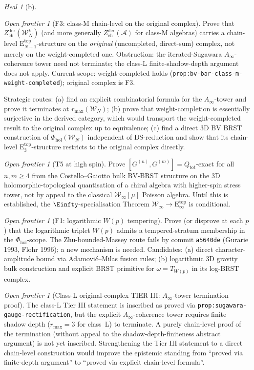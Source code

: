 \documentclass{article}
\theoremstyle{definition}
\theoremstyle{remark}
\newtheorem{heal}[theorem]{Heal}
\newtheorem{openfrontier}[theorem]{Open frontier}
\newcommand{\Phihol}{\Phi_{\mathrm{hol}}}
\newcommand{\Zder}{Z^{\mathrm{der}}_{\mathrm{ch}}}
\newcommand{\Etop}[1]{\mathrm{E}_{#1}^{\mathrm{top}}}
\newcommand{\cW}{\mathcal{W}}
\newcommand{\cA}{\mathcal{A}}
\begin{document}
\begin{heal}[b]
\begin{openfrontier}[F3: class-M chain-level on the original
complex]
\label{open:F3}
Prove that $\Zder(\cW_N^k)$ (and more generally
$\Zder(\cA)$ for class-M algebras) carries a chain-level
$\Etop{N+1}$-structure on the \emph{original} (uncompleted,
direct-sum) complex, not merely on the weight-completed
one. Obstruction: the iterated-Sugawara
$A_\infty$-coherence tower need not terminate; the
class-L finite-shadow-depth argument does not apply.
Current scope: weight-completed holds
(\texttt{prop:bv-bar-class-m-weight-completed}); original
complex is F3.

Strategic routes: (a) find an explicit combinatorial
formula for the $A_\infty$-tower and prove it terminates
at $r_{\max}(\cW_N)$; (b) prove that weight-completion is
essentially surjective in the derived category, which
would transport the weight-completed result to the
original complex up to equivalence; (c) find a direct 3D
BV BRST construction of
$\Phihol(\cW_N)$ independent of DS-reduction and show that
its chain-level $\Etop{3}$-structure restricts to the
original complex directly.
\end{openfrontier}

\begin{openfrontier}[T5 at high spin]
\label{open:T5}
Prove $[G^{(n)}, G^{(m)}] = Q_{\mathrm{tot}}$-exact for all
$n, m \ge 4$ from the Costello--Gaiotto bulk BV-BRST
structure on the 3D holomorphic-topological quantisation of
a chiral algebra with higher-spin stress tower, not by
appeal to the classical $\cW_\infty[\mu]$ Poisson algebra.
Until this is established, the $\Einfty$-specialisation
Theorem $\cW_\infty \to \Etop{\infty}$ is conditional.
\end{openfrontier}

\begin{openfrontier}[F1: logarithmic $W(p)$ tempering]
\label{open:F1}
Prove (or disprove at each $p$) that the logarithmic
triplet $W(p)$ admits a tempered-stratum membership in the
$\Phihol$-scope. The Zhu-bounded-Massey route fails by
commit \texttt{a5640de} (Gurarie 1993, Flohr 1996); a new
mechanism is needed. Candidates: (a) direct character-
amplitude bound via Adamovi\'c--Milas fusion rules; (b)
logarithmic 3D gravity bulk construction and explicit
BRST primitive for $\omega = T_{W(p)}$ in its log-BRST
complex.
\end{openfrontier}

\begin{openfrontier}[Class-L original-complex TIER III:
$A_\infty$-tower termination proof]
\label{open:classL-tierIII}
The class-L Tier III statement is inscribed as proved via
\texttt{prop:sugawara-gauge-rectification}, but the
explicit $A_\infty$-coherence tower requires finite shadow
depth ($r_{\max} = 3$ for class~L) to terminate. A purely
chain-level proof of the termination (without appeal to
the shadow-depth-finiteness abstract argument) is not yet
inscribed. Strengthening the Tier III statement to a
direct chain-level construction would improve the
epistemic standing from
``proved via finite-depth argument'' to ``proved via
explicit chain-level formula''.
\end{openfrontier}


\end{heal}
\end{document}
